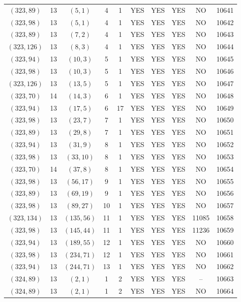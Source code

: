 \begin{longtable}{|c|c|c|c|c|c|c|c|c|c|}
$(323, 89)$ & 13 & $(5, 1)$ & 4 & 1 & YES & YES & YES & NO & 10641\\
$(323, 98)$ & 13 & $(5, 1)$ & 4 & 1 & YES & YES & YES & NO & 10642\\
$(323, 89)$ & 13 & $(7, 2)$ & 4 & 1 & YES & YES & YES & NO & 10643\\
$(323, 126)$ & 13 & $(8, 3)$ & 4 & 1 & YES & YES & YES & NO & 10644\\
$(323, 94)$ & 13 & $(10, 3)$ & 5 & 1 & YES & YES & YES & NO & 10645\\
$(323, 98)$ & 13 & $(10, 3)$ & 5 & 1 & YES & YES & YES & NO & 10646\\
$(323, 126)$ & 13 & $(13, 5)$ & 5 & 1 & YES & YES & YES & NO & 10647\\
$(323, 70)$ & 14 & $(14, 3)$ & 6 & 1 & YES & YES & YES & NO & 10648\\
$(323, 94)$ & 13 & $(17, 5)$ & 6 & 17 & YES & YES & YES & NO & 10649\\
$(323, 98)$ & 13 & $(23, 7)$ & 7 & 1 & YES & YES & YES & NO & 10650\\
$(323, 89)$ & 13 & $(29, 8)$ & 7 & 1 & YES & YES & YES & NO & 10651\\
$(323, 94)$ & 13 & $(31, 9)$ & 8 & 1 & YES & YES & YES & NO & 10652\\
$(323, 98)$ & 13 & $(33, 10)$ & 8 & 1 & YES & YES & YES & NO & 10653\\
$(323, 70)$ & 14 & $(37, 8)$ & 8 & 1 & YES & YES & YES & NO & 10654\\
$(323, 98)$ & 13 & $(56, 17)$ & 9 & 1 & YES & YES & YES & NO & 10655\\
$(323, 89)$ & 13 & $(69, 19)$ & 9 & 1 & YES & YES & YES & NO & 10656\\
$(323, 98)$ & 13 & $(89, 27)$ & 10 & 1 & YES & YES & YES & NO & 10657\\
$(323, 134)$ & 13 & $(135, 56)$ & 11 & 1 & YES & YES & YES & 11085 & 10658\\
$(323, 98)$ & 13 & $(145, 44)$ & 11 & 1 & YES & YES & YES & 11236 & 10659\\
$(323, 94)$ & 13 & $(189, 55)$ & 12 & 1 & YES & YES & YES & NO & 10660\\
$(323, 98)$ & 13 & $(234, 71)$ & 12 & 1 & YES & YES & YES & NO & 10661\\
$(323, 94)$ & 13 & $(244, 71)$ & 13 & 1 & YES & YES & YES & NO & 10662\\
$(324, 89)$ & 13 & $(2, 1)$ & 1 & 2 & YES & YES & YES & -- & 10663\\
$(324, 89)$ & 13 & $(2, 1)$ & 1 & 2 & YES & YES & YES & NO & 10664\\

\end{longtable}
